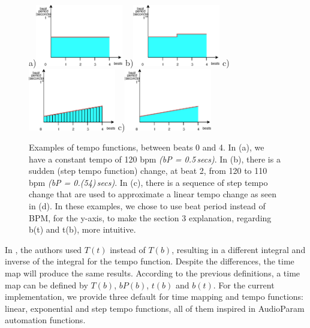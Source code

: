 \documentclass{sig-alternate}
\begin{document}
\begin{figure}
	a)\includegraphics[width=1.5in]{eps/constant-bpm}
	b)\includegraphics[width=1.5in]{eps/step-bpm}
	c)\includegraphics[width=1.5in]{eps/aprox-bpm}
	c)\includegraphics[width=1.5in]{eps/linear-bpm}
	\caption{Examples of tempo functions, between beats 0 and 4. In (a), we have a constant tempo of 120 bpm \textit{(bP = 0.5\,secs)}. In (b), there is a sudden (step tempo function) change, at beat 2, from 120 to 110 bpm \textit{(bP = 0.(54)\,secs)}. In (c), there is a sequence of step tempo change that are used to approximate a linear tempo change as seen in (d). In these examples, we chose to use beat period instead of BPM, for the y-axis, to make the section 3 explanation, regarding b(t) and t(b), more intuitive. } 
	\label{fig:tempochanges} 
\end{figure} 
In \cite{wheresthebeat}, the authors used $T(t)$ instead of $T(b)$, resulting in a different integral and inverse of the integral for the tempo function. Despite the differences, the time map will produce the same results. According to the previous definitions, a time map can be defined by $T(b)$, $bP(b)$, $t(b)$ and $b(t)$. For the current implementation, we provide three default for time mapping and tempo functions: linear, exponential and step tempo functions, all of them inspired in AudioParam automation functions.
\end{document}
